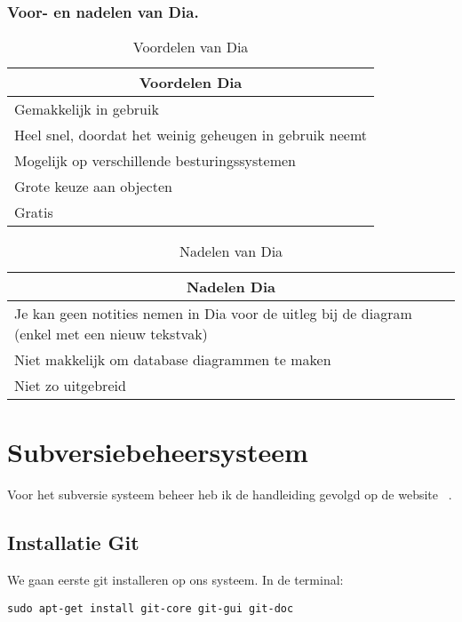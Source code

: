 \documentclass[11pt]{report}
\begin{document}
\subsection{Voor- en nadelen van Dia.~\cite{SiteVoorNadelen}}
\begin{table}[h!]
\caption{Voordelen van Dia}
\centering
\begin{tabular}{|p{10cm}|} \hline
\multicolumn{1}{|c|}{Voordelen Dia} \\ \hline \hline
Gemakkelijk in gebruik \\  \hline
Heel snel, doordat het weinig geheugen in gebruik neemt\\  \hline
Mogelijk op verschillende besturingssystemen\\  \hline
Grote keuze aan objecten \\  \hline
Gratis \\  \hline
\end{tabular}
\end{table}
\begin{table}[h!]
\caption{Nadelen van Dia}
\centering
\begin{tabular}{|p{10cm}|} \hline
\multicolumn{1}{|c|}{Nadelen Dia} \\ \hline \hline
Je kan geen notities nemen in Dia voor de uitleg bij de diagram (enkel met een nieuw tekstvak) \\  \hline
Niet makkelijk om database diagrammen te maken \\  \hline
Niet zo uitgebreid \\  \hline
\end{tabular}
\end{table}
\newpage
\appendix
\renewcommand*{\appendixname}{Bijlage}
\chapter{Subversiebeheersysteem}
Voor het subversie systeem beheer heb ik de handleiding gevolgd op de website ~\cite{SiteGit}.
\section{Installatie Git}
We gaan eerste git installeren op ons systeem.
In de terminal:
\begin{lstlisting}
sudo apt-get install git-core git-gui git-doc
\end{lstlisting}
\end{document}
